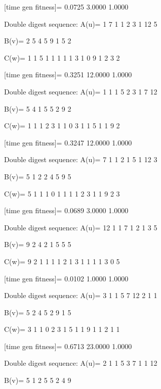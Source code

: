 [time gen fitness]=
    0.0725    3.0000    1.0000

Double digest sequence:
A(u)=
     1     7     1     1     2     3     1    12     5

B(v)=
     2     5     4     5     9     1     5     2

C(w)=
     1     1     5     1     1     1     1     1     3     1     0     9     1     2     3     2

[time gen fitness]=
    0.3251   12.0000    1.0000

Double digest sequence:
A(u)=
     1     1     1     5     2     3     1     7    12

B(v)=
     5     4     1     5     5     2     9     2

C(w)=
     1     1     1     2     3     1     1     0     3     1     1     5     1     1     9     2

[time gen fitness]=
    0.3247   12.0000    1.0000

Double digest sequence:
A(u)=
     7     1     1     2     1     5     1    12     3

B(v)=
     5     1     2     2     4     5     9     5

C(w)=
     5     1     1     1     0     1     1     1     1     2     3     1     1     9     2     3

[time gen fitness]=
    0.0689    3.0000    1.0000

Double digest sequence:
A(u)=
    12     1     1     7     1     2     1     3     5

B(v)=
     9     2     4     2     1     5     5     5

C(w)=
     9     2     1     1     1     1     2     1     3     1     1     1     1     3     0     5

[time gen fitness]=
    0.0102    1.0000    1.0000

Double digest sequence:
A(u)=
     3     1     1     5     7    12     2     1     1

B(v)=
     5     2     4     5     2     9     1     5

C(w)=
     3     1     1     0     2     3     1     5     1     1     9     1     1     2     1     1

[time gen fitness]=
    0.6713   23.0000    1.0000

Double digest sequence:
A(u)=
     2     1     1     5     3     7     1     1    12

B(v)=
     5     1     2     5     5     2     4     9

